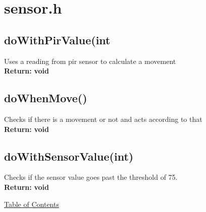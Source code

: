 \documentclass[11pt, numbers=endperiod]{report}
\newcommand{\Vseparation}{\vspace{10mm}}
\newcommand{\setColor}[1]
			{\color{blue!}\textbf{#1}\color{black!}}
\newcommand\MySection[2][\DefaultOpt]{%
  \def\DefaultOpt{#2}%
  \color{cyan!}\section[#1]{#2}\color{black!}%
}
\begin{document}
\MySection{sensor.h}
\label{sec: sensor.h}
\begin{tcolorbox}[colback=white,colframe=cyan,width=\dimexpr\textwidth+12mm\relax,enlarge left by=-6mm]

\subsection*{doWithPirValue(int}
Uses a reading from pir sensor to calculate a movement\\

\textbf{Return:} \setColor{void}
\Vseparation
\subsection*{doWhenMove()}
Checks if there is a movement or not and acts according to that\\

\textbf{Return:} \setColor{void}
\Vseparation
\subsection*{doWithSensorValue(int)}
Checks if the sensor value goes past the threshold of 75.\\

\textbf{Return:} \setColor{void}
\Vseparation
\end{tcolorbox}

\hyperlink{toc}{Table of Contents}
\end{document}
